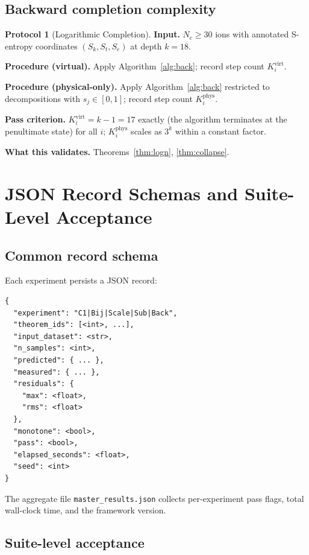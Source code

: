\documentclass[twocolumn,10pt,a4paper]{article}
\theoremstyle{thmstyle}
\theoremstyle{definition}
\newtheorem{protocol}[theorem]{Protocol}
\theoremstyle{remark}
\begin{document}
\subsection{Backward completion complexity}

\begin{protocol}[Logarithmic Completion]
\label{prot:back}
\textbf{Input.} $N_{c}\geq 30$ ions with annotated S-entropy
coordinates $(S_{k},S_{t},S_{e})$ at depth $k=18$.

\textbf{Procedure (virtual).} Apply Algorithm~\ref{alg:back}; record
step count $K_{i}^{\mathrm{virt}}$.

\textbf{Procedure (physical-only).} Apply Algorithm~\ref{alg:back}
restricted to decompositions with $s_{j}\in[0,1]$; record step count
$K_{i}^{\mathrm{phys}}$.

\textbf{Pass criterion.} $K_{i}^{\mathrm{virt}}=k-1=17$ exactly (the
algorithm terminates at the penultimate state) for all $i$;
$K_{i}^{\mathrm{phys}}$ scales as $3^{k}$ within a constant factor.

\textbf{What this validates.} Theorems~\ref{thm:logn}, \ref{thm:collapse}.
\end{protocol}

\section{JSON Record Schemas and Suite-Level Acceptance}
\label{sec:json}

\subsection{Common record schema}

Each experiment persists a JSON record:
\begin{verbatim}
{
  "experiment": "C1|Bij|Scale|Sub|Back",
  "theorem_ids": [<int>, ...],
  "input_dataset": <str>,
  "n_samples": <int>,
  "predicted": { ... },
  "measured": { ... },
  "residuals": {
    "max": <float>,
    "rms": <float>
  },
  "monotone": <bool>,
  "pass": <bool>,
  "elapsed_seconds": <float>,
  "seed": <int>
}
\end{verbatim}

The aggregate file \texttt{master\_results.json} collects per-experiment
pass flags, total wall-clock time, and the framework version.

\subsection{Suite-level acceptance}
\end{document}
